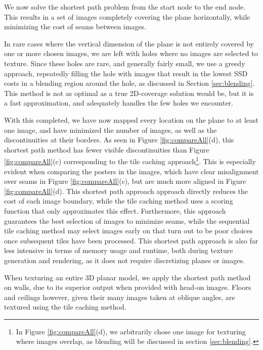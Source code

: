 \documentclass[]{spie}  %
\begin{document}
We now solve the shortest path problem from the start node to the end
node. This results in a set of images completely covering the plane
horizontally, while minimizing the cost of seams between images.

In rare cases where the vertical dimension of the plane is not
entirely covered by one or more chosen images, we are left with holes
where no images are selected to texture. Since these holes are rare,
and generally fairly small, we use a greedy approach, repeatedly
filling the hole with images that result in the lowest SSD costs in a
blending region around the hole, as discussed in Section
\ref{sec:blending}. This method is not as optimal as a true
2D-coverage solution would be, but it is a fast approximation, and
adequately handles the few holes we encounter.

With this completed, we have now mapped every location on the plane to
at least one image, and have minimized the number of images, as well
as the discontinuities at their borders. As seen in Figure
\ref{fig:compareAll}(d), this shortest path method has fewer visible
discontinuities than Figure \ref{fig:compareAll}(c) corresponding to
the tile caching approach\footnote{In Figure \ref{fig:compareAll}(d),
  we arbitrarily chose one image for texturing where images overlap,
  as blending will be discussed in section \ref{sec:blending}.}. This
is especially evident when comparing the posters in the images, which
have clear misalignment over seams in Figure \ref{fig:compareAll}(c),
but are much more aligned in Figure \ref{fig:compareAll}(d). This
shortest path approach approach directly reduces the cost of each
image boundary, while the tile caching method uses a scoring function
that only approximates this effect. Furthermore, this approach
guarantees the best selection of images to minimize seams, while the
sequential tile caching method may select images early on that turn
out to be poor choices once subsequent tiles have been processed. This
shortest path approach is also far less intensive in terms of memory
usage and runtime, both during texture generation and rendering, as it
does not require discretizing planes or images.

When texturing an entire 3D planar model, we apply the shortest path
method on walls, due to its superior output when provided with head-on
images. Floors and ceilings however, given their many images taken at
oblique angles, are textured using the tile caching method.
\end{document}

